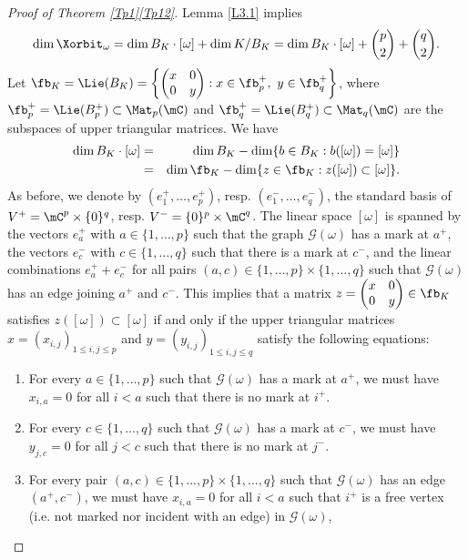 \begin{proof}[Proof of Theorem \ref{Tp1}\ref{Tp12}]
Lemma \ref{L3.1} implies
\begin{equation}
\label{dim-1}
\dim\Xorbit_\omega=\dim B_K\cdot[\omega]+\dim K/B_K=\dim B_K\cdot[\omega]+\binom{p}{2}+\binom{q}{2}.
\end{equation}
Let $\fb_K=\Lie(B_K)=\left\{\begin{pmatrix} x & 0\\ 0 & y \end{pmatrix}:x\in\fb_p^+,\ y\in\fb_q^+\right\}$, where $\fb_p^+=\Lie(B_p^+)\subset\Mat_p(\mC)$ and $\fb_q^+=\Lie(B_q^+)\subset\Mat_q(\mC)$ are the subspaces of upper triangular matrices.
We have
\begin{eqnarray}
\dim B_K\cdot[\omega] & = & \dim B_K-\dim\{b\in B_K:b([\omega])=[\omega]\}  \label{dim-2}\\
 & = & \dim\fb_K-\dim\{z\in\fb_K:z([\omega])\subset[\omega]\}. \nonumber
\end{eqnarray}
As before, we denote by $(e_1^+,\ldots,e_p^+)$, resp. $(e_1^-,\ldots,e_q^-)$, the standard basis of $V^+=\mC^p\times\{0\}^q$, resp. $V^-=\{0\}^p\times\mC^q$.
The linear space $[\omega]$ is spanned by the vectors $e_a^+$ with $a\in\{1,\ldots,p\}$ such that the graph $\mathcal{G}(\omega)$ has a mark at $a^+$, the vectors $e_c^-$ with $c\in\{1,\ldots,q\}$ such that there is a mark at $c^-$, and the linear combinations $e_a^++e_c^-$ for all pairs $(a,c)\in\{1,\ldots,p\}\times\{1,\ldots,q\}$ such that $\mathcal{G}(\omega)$ has an edge joining $a^+$ and $c^-$.
This implies that a matrix $z=\begin{pmatrix} x & 0\\ 0 & y \end{pmatrix}\in\fb_K$
satisfies $z([\omega])\subset [\omega]$ if and only if the upper triangular matrices $x=(x_{i,j})_{1\leq i,j\leq p}$ and $y=(y_{i,j})_{1\leq i,j\leq q}$ satisfy the following equations:
\begin{enumerate}
\item For every $a\in\{1,\ldots,p\}$ such that $\mathcal{G}(\omega)$ has a mark at $a^+$, we must have $x_{i,a}=0$ for all $i<a$ such that there is no mark at $i^+$.
\item For every $c\in\{1,\ldots,q\}$ such that $\mathcal{G}(\omega)$ has a mark at $c^-$, we must have $y_{j,c}=0$ for all $j<c$ such that there is no mark at $j^-$.
\item For every pair $(a,c)\in\{1,\ldots,p\}\times\{1,\ldots,q\}$ such that $\mathcal{G}(\omega)$ has an edge $(a^+,c^-)$, we must have $x_{i,a}=0$ for all $i<a$ such that $i^+$ is a free vertex (i.e. not marked nor incident with an edge) in $\mathcal{G}(\omega)$,

\end{enumerate}
\end{proof}
